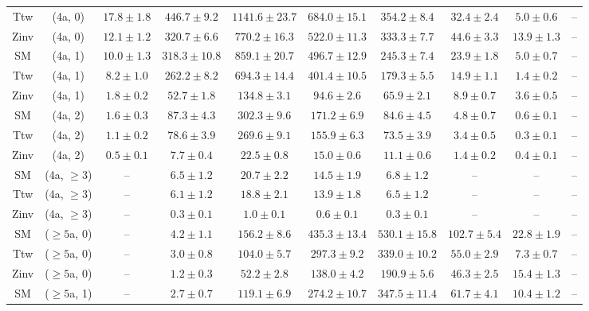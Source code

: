 \begin{table}[h!]
{\begin{tabular}{cccccccccc}
	Ttw & (4a, 0) & $17.8\pm 1.8$ & $446.7\pm 9.2$ & $1141.6\pm 23.7$ & $684.0\pm 15.1$ & $354.2\pm 8.4$ & $32.4\pm 2.4$ & $5.0\pm 0.6$ & -- \\[0.5ex] 
	Zinv & (4a, 0) & $12.1\pm 1.2$ & $320.7\pm 6.6$ & $770.2\pm 16.3$ & $522.0\pm 11.3$ & $333.3\pm 7.7$ & $44.6\pm 3.3$ & $13.9\pm 1.3$ & -- \\[0.5ex] 
	SM & (4a, 1) & $10.0\pm 1.3$ & $318.3\pm 10.8$ & $859.1\pm 20.7$ & $496.7\pm 12.9$ & $245.3\pm 7.4$ & $23.9\pm 1.8$ & $5.0\pm 0.7$ & -- \\[0.5ex] 
	Ttw & (4a, 1) & $8.2\pm 1.0$ & $262.2\pm 8.2$ & $694.3\pm 14.4$ & $401.4\pm 10.5$ & $179.3\pm 5.5$ & $14.9\pm 1.1$ & $1.4\pm 0.2$ & -- \\[0.5ex] 
	Zinv & (4a, 1) & $1.8\pm 0.2$ & $52.7\pm 1.8$ & $134.8\pm 3.1$ & $94.6\pm 2.6$ & $65.9\pm 2.1$ & $8.9\pm 0.7$ & $3.6\pm 0.5$ & -- \\[0.5ex] 
	SM & (4a, 2) & $1.6\pm 0.3$ & $87.3\pm 4.3$ & $302.3\pm 9.6$ & $171.2\pm 6.9$ & $84.6\pm 4.5$ & $4.8\pm 0.7$ & $0.6\pm 0.1$ & -- \\[0.5ex] 
	Ttw & (4a, 2) & $1.1\pm 0.2$ & $78.6\pm 3.9$ & $269.6\pm 9.1$ & $155.9\pm 6.3$ & $73.5\pm 3.9$ & $3.4\pm 0.5$ & $0.3\pm 0.1$ & -- \\[0.5ex] 
	Zinv & (4a, 2) & $0.5\pm 0.1$ & $7.7\pm 0.4$ & $22.5\pm 0.8$ & $15.0\pm 0.6$ & $11.1\pm 0.6$ & $1.4\pm 0.2$ & $0.4\pm 0.1$ & -- \\[0.5ex] 
	SM & (4a, $\ge3$) & -- & $6.5\pm 1.2$ & $20.7\pm 2.2$ & $14.5\pm 1.9$ & $6.8\pm 1.2$ & -- & -- & -- \\[0.5ex] 
	Ttw & (4a, $\ge3$) & -- & $6.1\pm 1.2$ & $18.8\pm 2.1$ & $13.9\pm 1.8$ & $6.5\pm 1.2$ & -- & -- & -- \\[0.5ex] 
	Zinv & (4a, $\ge3$) & -- & $0.3\pm 0.1$ & $1.0\pm 0.1$ & $0.6\pm 0.1$ & $0.3\pm 0.1$ & -- & -- & -- \\[0.5ex] 
	SM & ($\ge5$a, 0) & -- & $4.2\pm 1.1$ & $156.2\pm 8.6$ & $435.3\pm 13.4$ & $530.1\pm 15.8$ & $102.7\pm 5.4$ & $22.8\pm 1.9$ & -- \\[0.5ex] 
	Ttw & ($\ge5$a, 0) & -- & $3.0\pm 0.8$ & $104.0\pm 5.7$ & $297.3\pm 9.2$ & $339.0\pm 10.2$ & $55.0\pm 2.9$ & $7.3\pm 0.7$ & -- \\[0.5ex] 
	Zinv & ($\ge5$a, 0) & -- & $1.2\pm 0.3$ & $52.2\pm 2.8$ & $138.0\pm 4.2$ & $190.9\pm 5.6$ & $46.3\pm 2.5$ & $15.4\pm 1.3$ & -- \\[0.5ex] 
	SM & ($\ge5$a, 1) & -- & $2.7\pm 0.7$ & $119.1\pm 6.9$ & $274.2\pm 10.7$ & $347.5\pm 11.4$ & $61.7\pm 4.1$ & $10.4\pm 1.2$ & -- \\[0.5ex] 

\end{tabular}}
\end{table}
